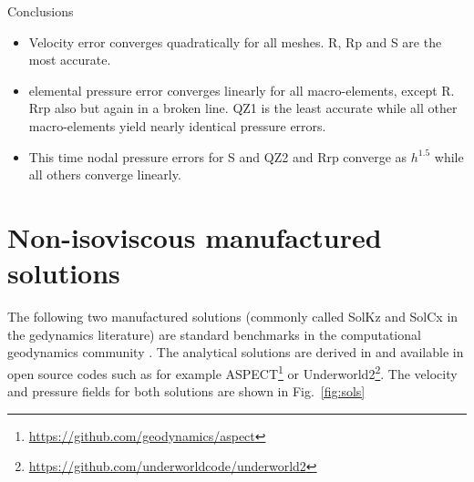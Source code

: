 \documentclass[a4paper,12pt]{article}
\begin{document}
Conclusions
\begin{itemize}
\item Velocity error converges quadratically for all meshes. R, Rp and S are the most accurate.
\item elemental pressure error converges linearly for all macro-elements, except R.
Rrp also but again in a broken line. QZ1 is the least accurate while all other macro-elements
yield nearly identical pressure errors.
\item This time nodal pressure errors for S and QZ2 and Rrp converge as $h^{1.5}$
while all others converge linearly.
\end{itemize}





\section{Non-isoviscous manufactured solutions}



The following two manufactured solutions (commonly called SolKz and SolCx in the 
gedynamics literature) are standard benchmarks in the computational geodynamics 
community \cite{mozg96,mamo08,krhb12,gemd13,demh19,thba22}.
The analytical solutions are derived in \cite{zhon96} and available in open source codes
such as for example ASPECT\footnote{\url{https://github.com/geodynamics/aspect}} or 
Underworld2\footnote{\url{https://github.com/underworldcode/underworld2}}.
The velocity and pressure fields for both solutions are shown in Fig.~\ref{fig:sols}
\end{document}
